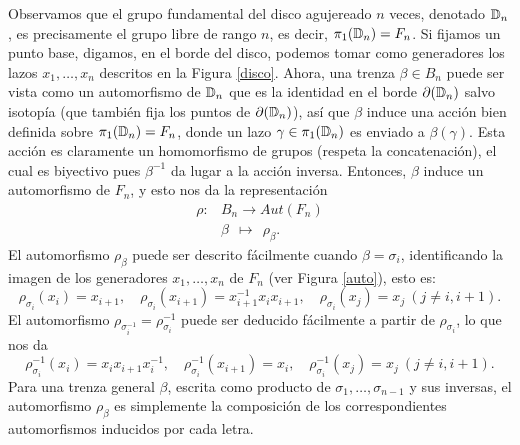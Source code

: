\documentclass[TFG.tex]{subfiles}
\begin{document}
Observamos que el grupo fundamental del disco agujereado $n$ veces, denotado $\mathbb{D}_n$, es precisamente el grupo libre de rango $n$, es decir, $\pi_1(\mathbb{D}_n)=F_n$. Si fijamos un punto base, digamos, en el borde del disco, podemos tomar como generadores los lazos $x_1,\dots, x_n$ descritos en la Figura \ref{disco}. Ahora, una trenza $\beta\in B_n$ puede ser vista como un automorfismo de $\mathbb{D}_n$ que es la identidad en el borde $\partial(\mathbb{D}_n)$ salvo isotopía (que también fija los puntos de $\partial(\mathbb{D}_n)$), así que $\beta$ induce una acción bien definida sobre $\pi_1(\mathbb{D}_n)=F_n$, donde un lazo $\gamma\in\pi_1(\mathbb{D}_n)$ es enviado a $\beta(\gamma)$. Esta acción es claramente un homomorfismo de grupos (respeta la concatenación), %
el cual es biyectivo pues $\beta^{-1}$ da lugar a la acción inversa. Entonces, $\beta$ induce un automorfismo de $F_n$, y esto nos da la representación
\begin{align*}
\rho: & B_n \to Aut(F_n)\\
      & \beta\ \ \mapsto\ \ \rho_\beta.
\end{align*}
El automorfismo $\rho_\beta$ puede ser descrito fácilmente cuando $\beta=\sigma_i$, identificando la imagen de los generadores $x_1,\dots, x_n$ de $F_n$ (ver Figura \ref{auto}), esto es:
$$\rho_{\sigma_i}(x_i)=x_{i+1},\quad \rho_{\sigma_i}(x_{i+1})=x_{i+1}^{-1}x_ix_{i+1},\quad \rho_{\sigma_i}(x_j)=x_j\ (j\neq i,i+1).$$
El automorfismo $\rho_{\sigma_i^{-1}}=\rho^{-1}_{\sigma_i}$ puede ser deducido fácilmente a partir de $\rho_{\sigma_i}$, lo que nos da
$$\rho^{-1}_{\sigma_i}(x_i)=x_ix_{i+1}x_i^{-1},\quad \rho^{-1}_{\sigma_i}(x_{i+1})=x_i,\quad \rho^{-1}_{\sigma_i}(x_j)=x_j\ (j\neq i,i+1).$$
Para una trenza general $\beta$, escrita como producto de $\sigma_1,\dots,\sigma_{n-1}$ y sus inversas, el automorfismo $\rho_\beta$ es simplemente la composición de los correspondientes automorfismos inducidos por cada letra.
\end{document}
